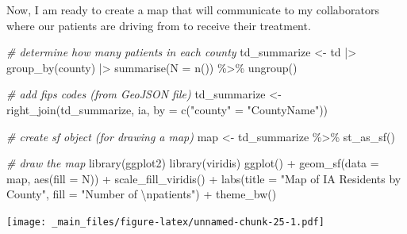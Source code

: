 \documentclass[
]{book}
\newenvironment{Shaded}{\begin{snugshade}}{\end{snugshade}}
\newcommand{\AttributeTok}[1]{\textcolor[rgb]{0.77,0.63,0.00}{#1}}
\newcommand{\CommentTok}[1]{\textcolor[rgb]{0.56,0.35,0.01}{\textit{#1}}}
\newcommand{\FunctionTok}[1]{\textcolor[rgb]{0.00,0.00,0.00}{#1}}
\newcommand{\NormalTok}[1]{#1}
\newcommand{\OtherTok}[1]{\textcolor[rgb]{0.56,0.35,0.01}{#1}}
\newcommand{\SpecialCharTok}[1]{\textcolor[rgb]{0.00,0.00,0.00}{#1}}
\newcommand{\StringTok}[1]{\textcolor[rgb]{0.31,0.60,0.02}{#1}}
\begin{document}
Now, I am ready to create a map that will communicate to my collaborators where our patients are driving from to receive their treatment.

\begin{Shaded}
\begin{Highlighting}[]
\CommentTok{\# determine how many patients in each county}
\NormalTok{td\_summarize }\OtherTok{\textless{}{-}}\NormalTok{ td }\SpecialCharTok{|\textgreater{}}
    \FunctionTok{group\_by}\NormalTok{(county) }\SpecialCharTok{|\textgreater{}}
    \FunctionTok{summarise}\NormalTok{(}\AttributeTok{N =} \FunctionTok{n}\NormalTok{()) }\SpecialCharTok{\%\textgreater{}\%}
  \FunctionTok{ungroup}\NormalTok{()}

\CommentTok{\# add fips codes (from GeoJSON file)}
\NormalTok{td\_summarize }\OtherTok{\textless{}{-}} \FunctionTok{right\_join}\NormalTok{(td\_summarize, ia,}
            \AttributeTok{by =} \FunctionTok{c}\NormalTok{(}\StringTok{"county"} \OtherTok{=} \StringTok{"CountyName"}\NormalTok{)) }

\CommentTok{\# create sf object (for drawing a map)}
\NormalTok{map }\OtherTok{\textless{}{-}}\NormalTok{ td\_summarize }\SpecialCharTok{\%\textgreater{}\%}
  \FunctionTok{st\_as\_sf}\NormalTok{()}

\CommentTok{\# draw the map }
\FunctionTok{library}\NormalTok{(ggplot2)}
\FunctionTok{library}\NormalTok{(viridis)}
\FunctionTok{ggplot}\NormalTok{() }\SpecialCharTok{+} 
  \FunctionTok{geom\_sf}\NormalTok{(}\AttributeTok{data =}\NormalTok{ map,}
          \FunctionTok{aes}\NormalTok{(}\AttributeTok{fill =}\NormalTok{ N)) }\SpecialCharTok{+} 
  \FunctionTok{scale\_fill\_viridis}\NormalTok{() }\SpecialCharTok{+} 
  \FunctionTok{labs}\NormalTok{(}\AttributeTok{title =} \StringTok{"Map of IA Residents by County"}\NormalTok{, }\AttributeTok{fill =} \StringTok{"Number of }\SpecialCharTok{\textbackslash{}n}\StringTok{patients"}\NormalTok{) }\SpecialCharTok{+}
  \FunctionTok{theme\_bw}\NormalTok{() }
\end{Highlighting}
\end{Shaded}

\texttt{[image: \_main\_files/figure-latex/unnamed-chunk-25-1.pdf]}

  
\end{document}

